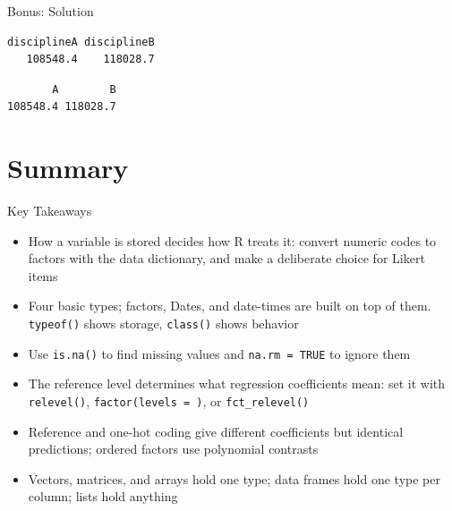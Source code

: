 \documentclass[
  ignorenonframetext,
  aspectratio=169,
]{beamer}
\newenvironment{Shaded}{\begin{snugshade}}{\end{snugshade}}
\newcommand{\FunctionTok}[1]{\textcolor[rgb]{0.28,0.35,0.67}{#1}}
\newcommand{\NormalTok}[1]{\textcolor[rgb]{0.00,0.23,0.31}{#1}}
\newcommand{\SpecialCharTok}[1]{\textcolor[rgb]{0.37,0.37,0.37}{#1}}
\providecommand{\tightlist}{%
  \setlength{\itemsep}{0pt}\setlength{\parskip}{0pt}}\usepackage{longtable,booktabs,array}
\begin{document}
\begin{frame}[fragile]{Bonus: Solution}
\begin{verbatim}
disciplineA disciplineB 
   108548.4    118028.7 
\end{verbatim}

\begin{Shaded}
\end{Shaded}

\begin{verbatim}
       A        B 
108548.4 118028.7 
\end{verbatim}
\end{frame}

\hypertarget{sec-summary}{%
\section{Summary}\label{sec-summary}}

\begin{frame}[fragile]{Key Takeaways}
\protect\hypertarget{key-takeaways}{}
\begin{itemize}
\tightlist
\item
  How a variable is stored decides how R treats it: convert numeric
  codes to factors with the data dictionary, and make a deliberate
  choice for Likert items
\item
  Four basic types; factors, Dates, and date-times are built on top of
  them. \texttt{typeof()} shows storage, \texttt{class()} shows behavior
\item
  Use \texttt{is.na()} to find missing values and
  \texttt{na.rm\ =\ TRUE} to ignore them
\item
  The reference level determines what regression coefficients mean: set
  it with \texttt{relevel()}, \texttt{factor(levels\ =\ )}, or
  \texttt{fct\_relevel()}
\item
  Reference and one-hot coding give different coefficients but identical
  predictions; ordered factors use polynomial contrasts
\item
  Vectors, matrices, and arrays hold one type; data frames hold one type
  per column; lists hold anything
\end{itemize}
\end{frame}
\end{document}
